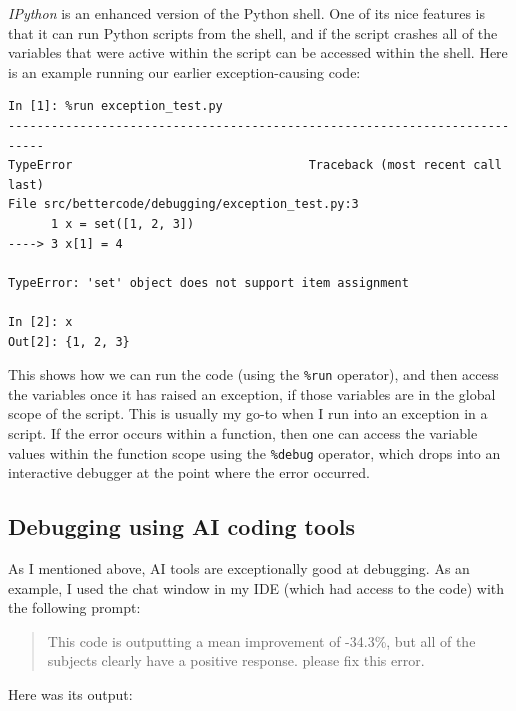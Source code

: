 \textit{IPython} is an enhanced version of the Python shell.  One of its nice features is that it can run Python scripts from the shell, and if the script crashes all of the variables that were active within the script can be accessed within the shell.  Here is an example running our earlier exception-causing code:

\begin{lstlisting}[style=repl]
In [1]: %run exception_test.py
---------------------------------------------------------------------------
TypeError                                 Traceback (most recent call last)
File src/bettercode/debugging/exception_test.py:3
      1 x = set([1, 2, 3])
----> 3 x[1] = 4

TypeError: 'set' object does not support item assignment

In [2]: x
Out[2]: {1, 2, 3}
\end{lstlisting}

This shows how we can run the code (using the \texttt{\%run} operator), and then access the variables once it has raised an exception, if those variables are in the global scope of the script.  This is usually my go-to when I run into an exception in a script. If the error occurs within a function, then one can access the variable values within the function scope using the \texttt{\%debug} operator, which drops into an interactive debugger at the point where the error occurred.

\subsection{Debugging using AI coding tools}

As I mentioned above, AI tools are exceptionally good at debugging.  As an example, I used the chat window in my IDE (which had access to the code) with the following prompt:

\begin{quote}
This code is outputting a mean improvement of -34.3\%, but all of the subjects clearly have a positive response. please fix this error.
\end{quote}

Here was its output:

